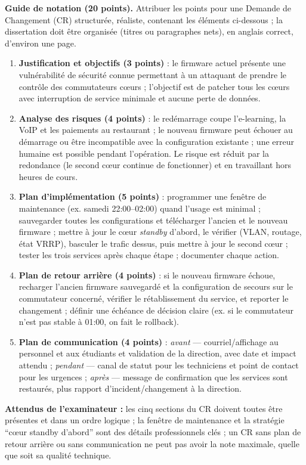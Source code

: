 \documentclass[11pt]{article}
\begin{document}
\begin{corrige}
\textbf{Guide de notation (20 points).} Attribuer les points pour une Demande de Changement (CR) structurée, réaliste, contenant les éléments ci-dessous ; la dissertation doit être organisée (titres ou paragraphes nets), en anglais correct, d'environ une page.
\begin{enumerate}
\item \textbf{Justification et objectifs (3 points)} : le firmware actuel présente une vulnérabilité de sécurité connue permettant à un attaquant de prendre le contrôle des commutateurs cœurs ; l'objectif est de patcher tous les cœurs avec interruption de service minimale et aucune perte de données.
\item \textbf{Analyse des risques (4 points)} : le redémarrage coupe l'e-learning, la VoIP et les paiements au restaurant ; le nouveau firmware peut échouer au démarrage ou être incompatible avec la configuration existante ; une erreur humaine est possible pendant l'opération. Le risque est réduit par la redondance (le second cœur continue de fonctionner) et en travaillant hors heures de cours.
\item \textbf{Plan d'implémentation (5 points)} : programmer une fenêtre de maintenance (ex. samedi 22:00--02:00) quand l'usage est minimal ; sauvegarder toutes les configurations et télécharger l'ancien et le nouveau firmware ; mettre à jour le cœur \emph{standby} d'abord, le vérifier (VLAN, routage, état VRRP), basculer le trafic dessus, puis mettre à jour le second cœur ; tester les trois services après chaque étape ; documenter chaque action.
\item \textbf{Plan de retour arrière (4 points)} : si le nouveau firmware échoue, recharger l'ancien firmware sauvegardé et la configuration de secours sur le commutateur concerné, vérifier le rétablissement du service, et reporter le changement ; définir une échéance de décision claire (ex. si le commutateur n'est pas stable à 01:00, on fait le rollback).
\item \textbf{Plan de communication (4 points)} : \emph{avant} --- courriel/affichage au personnel et aux étudiants et validation de la direction, avec date et impact attendu ; \emph{pendant} --- canal de statut pour les techniciens et point de contact pour les urgences ; \emph{après} --- message de confirmation que les services sont restaurés, plus rapport d'incident/changement à la direction.
\end{enumerate}
\textbf{Attendus de l'examinateur :} les cinq sections du CR doivent toutes être présentes et dans un ordre logique ; la fenêtre de maintenance et la stratégie ``cœur standby d'abord'' sont des détails professionnels clés ; un CR sans plan de retour arrière ou sans communication ne peut pas avoir la note maximale, quelle que soit sa qualité technique.
\end{corrige}
\end{document}
